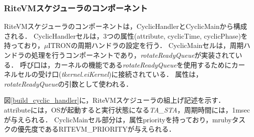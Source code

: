 \documentclass[submit,techrep]{ipsj}
\begin{document}
\subsubsection{RiteVMスケジューラのコンポーネント}
RiteVMスケジューラのコンポーネントは，CyclicHandlerとCyclicMainから構成される．
CyclicHandlerセルは，3つの属性(attribute, cyclicTime, cyclicPhase)を持っており，$\mu$ITRONの周期ハンドラ\cite{par:microITRON}の設定を行う．
CyclicMainセルは，周期ハンドラの処理を行うコンポーネントであり，{\it rotateReadyQueue}が実装されている．
呼び口は，カーネルの機能である{\it rotateReadyQueue}を使用するためにカーネルセルの受け口({\it tkernel.eiKernel})に接続されている．
属性は，{\it rotateReadyQueue}の引数として使われる．

図\ref{build_cyclic_handler}に，RiteVMスケジューラの組上げ記述を示す．
attributeには，OSが起動すると実行状態になる{\it TA\_STA}，周期時間には，1msecが与えられる．
CyclicMainセル部分は，属性priorityを持っており，mrubyタスクの優先度であるRITEVM\_PRIORITYが与えられる．
\end{document}
